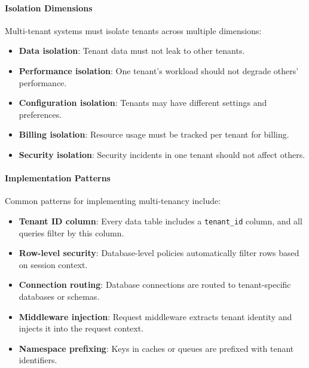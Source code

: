 \paragraph{Isolation Dimensions}

Multi-tenant systems must isolate tenants across multiple dimensions:

\begin{itemize}
    \item \textbf{Data isolation}: Tenant data must not leak to other tenants.
    \item \textbf{Performance isolation}: One tenant's workload should not degrade others' performance.
    \item \textbf{Configuration isolation}: Tenants may have different settings and preferences.
    \item \textbf{Billing isolation}: Resource usage must be tracked per tenant for billing.
    \item \textbf{Security isolation}: Security incidents in one tenant should not affect others.
\end{itemize}

\paragraph{Implementation Patterns}

Common patterns for implementing multi-tenancy include:

\begin{itemize}
    \item \textbf{Tenant ID column}: Every data table includes a \texttt{tenant\_id} column, and all queries filter by this column.
    
    \item \textbf{Row-level security}: Database-level policies automatically filter rows based on session context.
    
    \item \textbf{Connection routing}: Database connections are routed to tenant-specific databases or schemas.
    
    \item \textbf{Middleware injection}: Request middleware extracts tenant identity and injects it into the request context.
    
    \item \textbf{Namespace prefixing}: Keys in caches or queues are prefixed with tenant identifiers.
\end{itemize}

